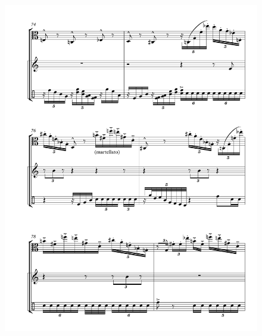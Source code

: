 \begin{figure}[htbp]
    \centering
	\includegraphics[width=6.5in]{figures/Viola_Percussion_11.pdf}
\end{figure}

